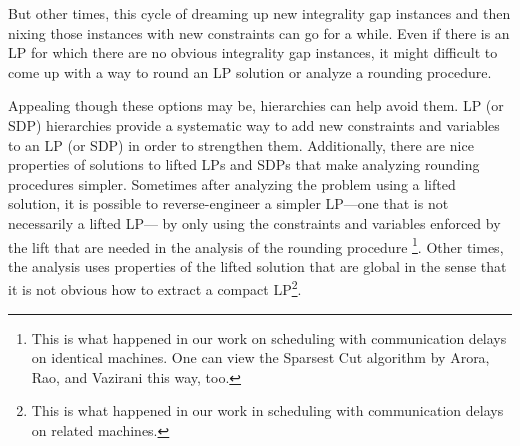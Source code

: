 But other times, this cycle of dreaming up new integrality gap instances and then nixing those instances with new constraints can go for a while.
Even if there is an LP for which there are no obvious integrality gap instances, 
it might difficult to come up with a way to round an LP solution or analyze a rounding procedure.

Appealing though these options may be, hierarchies can help avoid them. 
LP (or SDP) hierarchies provide a systematic way to add new constraints and variables to an LP (or SDP) in order to strengthen them.
Additionally, there are nice properties of solutions to lifted LPs and SDPs that make analyzing rounding procedures simpler.
Sometimes after analyzing the problem using a lifted solution, it is possible to reverse-engineer a simpler LP---one that is not necessarily a lifted LP---
by only using the constraints and variables enforced by the lift that are needed in the analysis of the rounding procedure
\footnote{This is what happened in our work on scheduling with 
communication delays on identical machines. One can view the Sparsest Cut algorithm by Arora, Rao, and Vazirani this way, too.}. 
Other times, the analysis uses properties of the lifted solution that are global in the sense that it is not obvious how to extract a compact LP\footnote{This is what happened in our work in scheduling with 
communication delays on related machines.}. 

